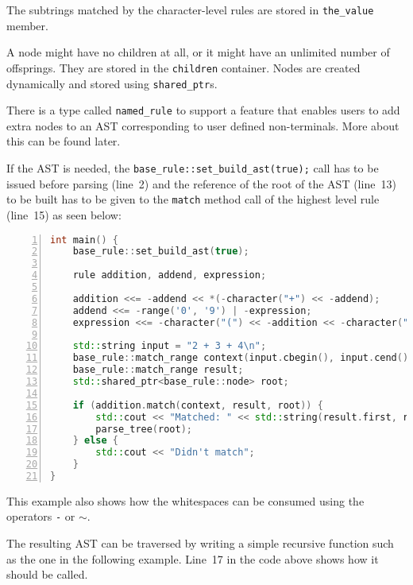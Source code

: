 \documentclass[12pt]{article}
\begin{document}
The subtrings matched by the character-level rules are stored in \texttt{the\_value} member.

A node might have no children at all, or it might have an unlimited number of offsprings. They are stored in
the \texttt{children} container. Nodes are created dynamically and stored using \texttt{shared\_ptr}s. 

There is a type called \texttt{named\_rule} to support a feature that enables users to add extra nodes to an
AST corresponding to user defined non-terminals.  More about this can be found later.

If the AST is needed, the \texttt{base\_rule::set\_build\_ast(true);} call has to be issued before parsing
(line~2) and the reference of the root of the AST (line~13) to be built has to be given to the \texttt{match}
method call of the highest level rule (line~15) as seen below:

\begin{center}
	\begin{minipage}[h]{0.85\textwidth}
		\begin{lstlisting}[language=C++, breaklines=true, numbers=left]
int main() {
	base_rule::set_build_ast(true);

	rule addition, addend, expression;

	addition <<= -addend << *(-character("+") << -addend);
	addend <<= -range('0', '9') | -expression;
	expression <<= -character("(") << -addition << -character(")");

	std::string input = "2 + 3 + 4\n";
	base_rule::match_range context(input.cbegin(), input.cend());
	base_rule::match_range result;
	std::shared_ptr<base_rule::node> root;

	if (addition.match(context, result, root)) {
		std::cout << "Matched: " << std::string(result.first, result.second);
		parse_tree(root);
	} else {
		std::cout << "Didn't match";
	}
}
		\end{lstlisting}
	\end{minipage}
\end{center}

This example also shows how the whitespaces can be consumed using the operators \texttt{-} or \texttt{$\sim$}.

The resulting AST can be traversed by writing a simple recursive function such as the one in the following
example. Line~17 in the code above shows how it should be called.
\end{document}
